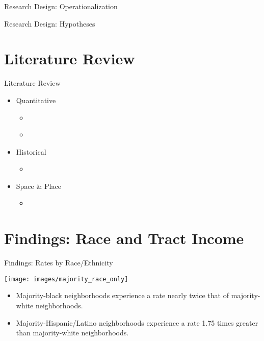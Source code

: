\documentclass{beamer}
\begin{document}
\begin{frame}{Research Design: Operationalization}
	
\end{frame}

\begin{frame}{Research Design: Hypotheses}
	
\end{frame}

\section{Literature Review}
\begin{frame}{Literature Review}
	\begin{itemize}
		\item Quantitative
		\begin{itemize}
			\item \textcite{feldmanPoliceRelatedDeathsNeighborhood2019}
			\item \textcite{feldmanPoliceKillingsUS2020} \pause
		\end{itemize}
		\item Historical
		\begin{itemize}
			\item \citeauthor{johnsonAfterwordBaltimorePolicing2016} \parencites*{
			johnsonAfterwordBaltimorePolicing2016, 
			johnsonTrumpismPolicingProblem2019, 
			johnsonBlackLivesMatter2023} \pause
		\end{itemize}
		\item Space \& Place
		\begin{itemize}
			\item \textcite{wacquantClassRaceHyperincarceration2010}
		\end{itemize}
	\end{itemize}
\end{frame}

\section{Findings: Race and Tract Income}
\begin{frame}{Findings: Rates by Race/Ethnicity}
	\begin{center}
	\texttt{[image: images/majority\_race\_only]}	
	\end{center}
	
	\vspace*{24pt}
	
	\begin{itemize}
	\item Majority-black neighborhoods experience a rate nearly twice that of majority-white neighborhoods.
	\item Majority-Hispanic/Latino neighborhoods experience a rate 1.75 times greater than majority-white neighborhoods.
	\end{itemize}	
\end{frame}
\end{document}
